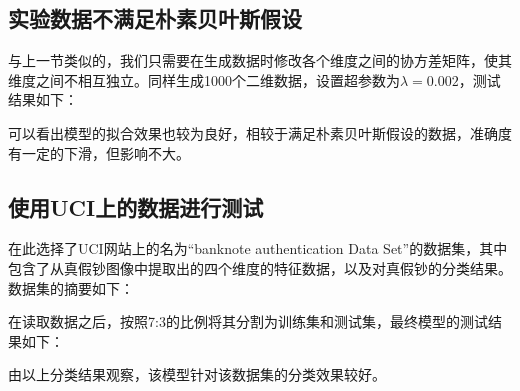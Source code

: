 \documentclass[12pt]{article}
\begin{document}
\subsection{实验数据不满足朴素贝叶斯假设}
与上一节类似的，我们只需要在生成数据时修改各个维度之间的协方差矩阵，使其维度之间不相互独立。同样生成1000个二维数据，设置超参数为$\lambda=0.002$，测试结果如下：
\begin{figure}[H]
    \centering
\end{figure}
可以看出模型的拟合效果也较为良好，相较于满足朴素贝叶斯假设的数据，准确度有一定的下滑，但影响不大。
\subsection{使用UCI上的数据进行测试}
在此选择了UCI网站上的名为“banknote authentication Data Set”的数据集，其中包含了从真假钞图像中提取出的四个维度的特征数据，以及对真假钞的分类结果。数据集的摘要如下：
\begin{figure}[H]
    \centering
\end{figure}
在读取数据之后，按照7:3的比例将其分割为训练集和测试集，最终模型的测试结果如下：
\begin{figure}[H]
    \centering
\end{figure}
由以上分类结果观察，该模型针对该数据集的分类效果较好。
\end{document}
